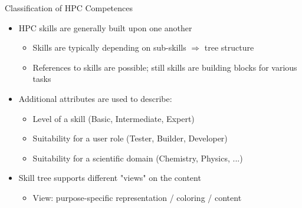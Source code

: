 \documentclass[compress,aspectratio=169]{beamer}
\begin{document}
\begin{frame}{Classification of HPC Competences}
	\begin{itemize}
		\item HPC skills are generally built upon one another
		\begin{itemize}
			\item Skills are typically depending on sub-skills $\Rightarrow$ tree structure
			\item References to skills are possible; still skills are building blocks for various tasks
		\end{itemize}

		\item Additional attributes are used to describe:
		\begin{itemize}
			\item Level of a skill (Basic, Intermediate, Expert)
			\item Suitability for a user role (Tester, Builder, Developer)
			\item Suitability for a scientific domain (Chemistry, Physics, ...)
		\end{itemize}
		\item Skill tree supports different "views" on the content
			\begin{itemize}
				\item View: purpose-specific representation / coloring / content
			\end{itemize}
	\end{itemize}
\end{frame}
\end{document}
